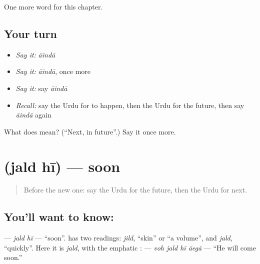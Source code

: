 \begin{grammarlens}[title={What you've built}]
One more word for this chapter.
\end{grammarlens}

\subsection*{Your turn}
\begin{itemize}
\raggedright
  \item \emph{Say it:} \emph{āindā}
  \item \emph{Say it:} \emph{āindā}, once more
  \item \emph{Say it:} say \emph{āindā}
  \item \emph{Recall:} say the Urdu for to happen, then the Urdu for the future, then say \emph{āindā} again
\end{itemize}

\begin{tcolorbox}[breakable,colback=teal!4,colframe=teal!35!black,title={Before you move on}]
What does  mean? (\textquotedblleft{}Next, in future\textquotedblright{}.) Say it once more.
\end{tcolorbox}
\section[\texorpdfstring{\ur{جلد} \ur{ہی} (jald hī)}{جلد ہی (jald hī)}]{  (jald hī) — soon}

\label{lesson:UR-C145-jald-hi}



\begin{quote}
Before the new one: say the Urdu for the future, then the Urdu for next.
\end{quote}

\subsection*{You'll want to know:  }
\textbf{ } — \emph{jald hī} — \textquotedblleft{}soon\textquotedblright{}. \textbf{} has two readings: \emph{jild}, \textquotedblleft{}skin\textquotedblright{} or \textquotedblleft{}a volume\textquotedblright{}, and \emph{jald}, \textquotedblleft{}quickly\textquotedblright{}. Here it is \emph{jald}, with the emphatic \textbf{}: \textbf{    } — \emph{voh jald hī āegā} — \textquotedblleft{}He will come soon.\textquotedblright{}

